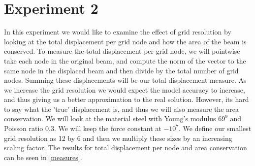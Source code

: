  \section{Experiment 2}
 In this experiment we would like to examine the effect of grid resolution by looking at the total displacement per grid node and how the area of the beam is conserved. To measure the total displacement per grid node, we will pointwise take each node in the original beam, and compute the norm of the vector to the same node in the displaced beam and then divide by the total number of grid nodes. Summing these displacements will be our total displacement measure. As we increase the grid resolution we would expect the model accuracy to increase, and thus giving us a better approximation to the real solution. However, its hard to say what the 'true' displacement is, and thus we will also measure the area conservation. We will look at the material steel with Young's modulus $69^9$ and Poisson ratio $0.3$. We will keep the force constant at $-10^7$. We define our smallest grid resolution as 12 by 6 and then we multiply these sizes by an increasing scaling factor. The results for total displacement per node and area conservation can be seen in \autoref{measures}.

